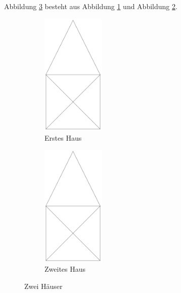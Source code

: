 \documentclass[12pt,a4paper]{book}
\begin{document}
Abbildung \ref{fig:subhouses2} besteht aus Abbildung \ref{fig:subhouse21} und Abbildung \ref{fig:subhouse22}.
\begin{figure}[hbt]
	\begin{subfigure}[b]{.5\linewidth} 
		\centering
		\includegraphics[width=3cm]{house/house.png}
		\caption{Erstes Haus}\label{fig:subhouse21}
	\end{subfigure}
	\hfil
	\begin{subfigure}[b]{.5\linewidth}
		\centering
		\includegraphics[width=3cm,angle=180]{house/house.png}
		\caption{Zweites Haus}\label{fig:subhouse22}
	\end{subfigure}
	\caption{Zwei Häuser}\label{fig:subhouses2}
\end{figure}
\end{document}
